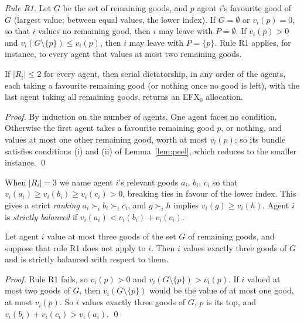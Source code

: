 \documentclass[runningheads,11pt]{llncs}
\newcommand{\efxz}{\texorpdfstring{\mbox{EFX$_0$}}{EFX0}}
\begin{document}
\noindent \emph{Rule R1.} Let $G$ be the set of remaining goods, and $p$ agent $i$'s favourite good of $G$ (largest value; between equal values, the lower index). If $G=\emptyset$ or $v_i(p)=0$, so that $i$ values no remaining good, then $i$ may leave with $P=\emptyset$. If $v_i(p)>0$ and $v_i(G\setminus\{p\})\le v_i(p)$, then $i$ may leave with $P=\{p\}$. Rule R1 applies, for instance, to every agent that values at most two remaining goods.

\begin{corollary}\label{cor:k2}
If $|R_i|\le2$ for every agent, then serial dictatorship, in any order of the agents, each taking a favourite remaining good (or nothing once no good is left), with the last agent taking all remaining goods, returns an \efxz{} allocation.
\end{corollary}

\begin{proof}
By induction on the number of agents. One agent faces no condition. Otherwise the first agent takes a favourite remaining good $p$, or nothing, and values at most one other remaining good, worth at most $v_i(p)$; so its bundle satisfies conditions (i) and (ii) of Lemma~\ref{lem:peel}, which reduces to the smaller instance. \qed
\end{proof}

\noindent When $|R_i|=3$ we name agent $i$'s relevant goods $a_i$, $b_i$, $c_i$ so that $v_i(a_i)\ge v_i(b_i)\ge v_i(c_i)>0$, breaking ties in favour of the lower index. This gives a strict \emph{ranking} $a_i\succ_i b_i\succ_i c_i$, and $g\succ_i h$ implies $v_i(g)\ge v_i(h)$. Agent $i$ is \emph{strictly balanced} if $v_i(a_i)<v_i(b_i)+v_i(c_i)$.

\begin{lemma}\label{lem:R1fail}
Let agent $i$ value at most three goods of the set $G$ of remaining goods, and suppose that rule R1 does not apply to $i$. Then $i$ values exactly three goods of $G$ and is strictly balanced with respect to them.
\end{lemma}

\begin{proof}
Rule R1 fails, so $v_i(p)>0$ and $v_i(G\setminus\{p\})>v_i(p)$. If $i$ valued at most two goods of $G$, then $v_i(G\setminus\{p\})$ would be the value of at most one good, at most $v_i(p)$. So $i$ values exactly three goods of $G$, $p$ is its top, and $v_i(b_i)+v_i(c_i)>v_i(a_i)$. \qed
\end{proof}
\end{document}
